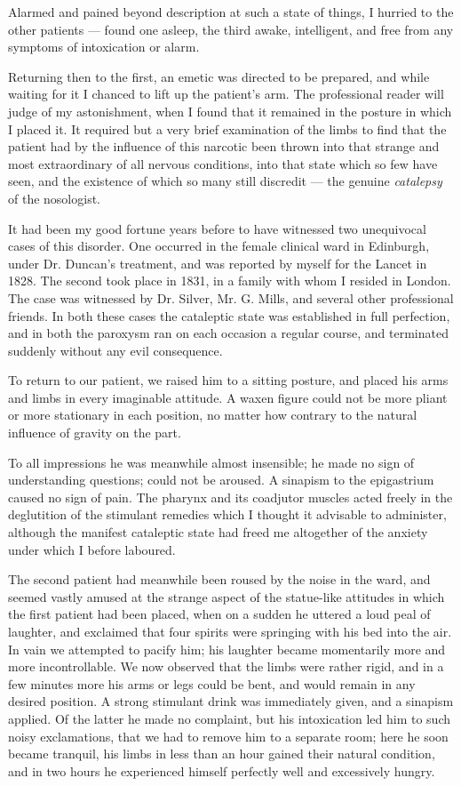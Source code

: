 \documentclass[a4paper, 11pt, oneside, polutonikogreek, english]{article}
\begin{document}
Alarmed and pained beyond description at such a state of things, I hurried to the other patients --- found one asleep, the third awake, intelligent, and free from any symptoms of intoxication or alarm.

Returning then to the first, an emetic was directed to be prepared, and while waiting for it I chanced to lift up the patient's arm. The professional reader will judge of my astonishment, when I found that it remained in the posture in which I placed it. It required but a very brief examination of the limbs to find that the patient had by the influence of this narcotic been thrown into that strange and most extraordinary of all nervous conditions, into that state which so few have seen, and the existence of which so many still discredit --- the genuine \emph{catalepsy} of the nosologist.

It had been my good fortune years before to have witnessed two unequivocal cases of this disorder. One occurred in the female clinical ward in Edinburgh, under Dr. Duncan's treatment, and was reported by myself for the Lancet in 1828. The second took place in 1831, in a family with whom I resided in London. The case was witnessed by Dr. Silver, Mr. G. Mills, and several other professional friends. In both these cases the cataleptic state was established in full perfection, and in both the paroxysm ran on each occasion a regular course, and terminated suddenly without any evil consequence.

To return to our patient, we raised him to a sitting posture, and placed his arms and limbs in every imaginable attitude. A waxen figure could not be more pliant or more stationary in each position, no matter how contrary to the natural influence of gravity on the part.

To all impressions he was meanwhile almost insensible; he made no sign of understanding questions; could not be aroused. A sinapism to the epigastrium caused no sign of pain. The pharynx and its coadjutor muscles acted freely in the deglutition of the stimulant remedies which I thought it advisable to administer, although the manifest cataleptic state had freed me altogether of the anxiety under which I before laboured.

The second patient had meanwhile been roused by the noise in the ward, and seemed vastly amused at the strange aspect of the statue-like attitudes in which the first patient had been placed, when on a sudden he uttered a loud peal of laughter, and exclaimed that four spirits were springing with his bed into the air. In vain we attempted to pacify him; his laughter became momentarily more and more incontrollable. We now observed that the limbs were rather rigid, and in a few minutes more his arms or legs could be bent, and would remain in any desired position. A strong stimulant drink was immediately given, and a sinapism applied. Of the latter he made no complaint, but his intoxication led him to such noisy exclamations, that we had to remove him to a separate room; here he soon became tranquil, his limbs in less than an hour gained their natural condition, and in two hours he experienced himself perfectly well and excessively hungry.
\end{document}
